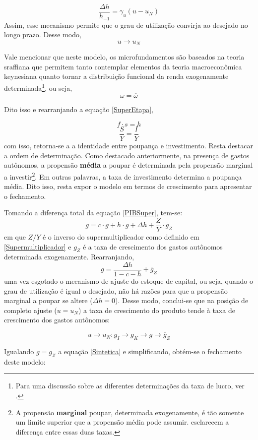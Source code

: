 $$
\frac{\Delta h}{h_{-1}} = \gamma_u (u - u_N)
$$
Assim, esse mecanismo permite que o grau de utilização convirja ao desejado no longo prazo. Desse modo,
$$
u \to u_N
$$

Vale mencionar que neste modelo, os microfundamentos são baseados na teoria sraffiana que permitem tanto contemplar elementos da teoria macroeconômica keynesiana quanto tornar a distribuição funcional da renda exogenamente determinada\footnote{Para uma discussão sobre as diferentes determinações da taxa de lucro, ver \textcite{serrano_teoria_1988}.}, ou seja,
$$
\omega = \overline \omega
$$

Dito isso e rearranjando a equação \ref{SuperEtapa}, 

$$
f\cdot s = h
$$
$$
\frac{S}{Y} = \frac{I}{Y}
$$
com isso, retorna-se a a identidade entre poupança e investimento. Resta destacar a ordem de determinação. Como destacado anteriormente, na presença de gastos autônomos, a propensão \textbf{média} a poupar é determinada pela propensão marginal a investir\footnote{A propensão \textbf{marginal} poupar, determinada exogenamente, é tão somente um limite superior que a propensão média pode assumir. \textcite[p.~51--52]{serrano_o_2000} esclarecem a diferença entre essas duas taxas.}. Em outras palavras, a taxa de investimento determina a poupança média.
Dito isso, resta expor o modelo em termos de crescimento para apresentar o fechamento.


Tomando a diferença total da equação \ref{PIBSuper}, tem-se:
$$
g = c\cdot g + h\cdot g + \Delta h + \frac{Z}{Y}\cdot \overline g_Z
$$
em que $Z/Y$ é o inverso do supermultiplicador como definido em \ref{Supermultiplicador} e $g_Z$ é a taxa de crescimento dos gastos autônomos determinada exogenamente. Rearranjando, 
\begin{equation}
\label{crescimentosuper}
g = \frac{\Delta h}{1 - c - h} + \overline g_Z
\end{equation}
uma vez esgotado o mecanismo de ajuste do estoque de capital, ou seja, quando o grau de utilização é igual o desejado, não há razões para que a propensão marginal a poupar se altere ($\Delta h = 0$). Desse modo, conclui-se que na posição de completo ajuste ($u = u_N$) a taxa de crescimento do produto tende à taxa de crescimento dos gastos autônomos:

$$
u \to u_N : g_I \to g_K \to g \to \overline g_Z
$$

Igualando $g = g_Z$ a equação \ref{Sintetica} e simplificando, obtém-se o fechamento deste modelo:

